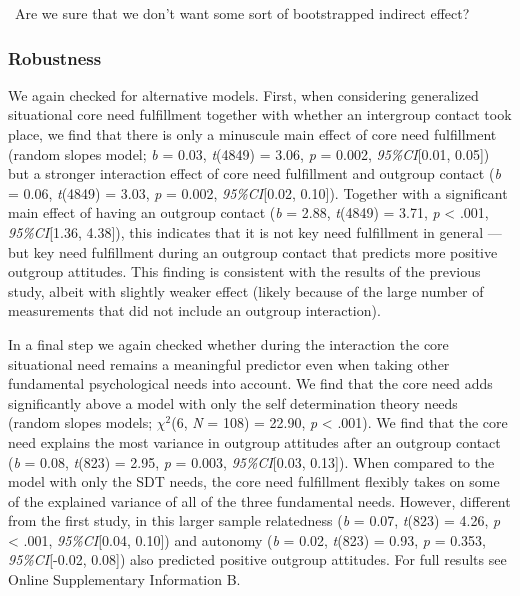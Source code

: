 \faQuestionCircle~Are we sure that we don't want some sort of
bootstrapped indirect effect?

\subsubsection{Robustness}

We again checked for alternative models. First, when considering
generalized situational core need fulfillment together with whether an
intergroup contact took place, we find that there is only a minuscule
main effect of core need fulfillment (random slopes model; \textit{b} =
0.03, \textit{t}(4849) = 3.06, \textit{p} = 0.002,
\textit{95\%CI}{[}0.01, 0.05{]}) but a stronger interaction effect of
core need fulfillment and outgroup contact (\textit{b} = 0.06,
\textit{t}(4849) = 3.03, \textit{p} = 0.002, \textit{95\%CI}{[}0.02,
0.10{]}). Together with a significant main effect of having an outgroup
contact (\textit{b} = 2.88, \textit{t}(4849) = 3.71, \textit{p}
\textless{} .001, \textit{95\%CI}{[}1.36, 4.38{]}), this indicates that
it is not key need fulfillment in general --- but key need fulfillment
during an outgroup contact that predicts more positive outgroup
attitudes. This finding is consistent with the results of the previous
study, albeit with slightly weaker effect (likely because of the large
number of measurements that did not include an outgroup interaction).

In a final step we again checked whether during the interaction the core
situational need remains a meaningful predictor even when taking other
fundamental psychological needs into account. We find that the core need
adds significantly above a model with only the self determination theory
needs (random slopes models; \(\chi^2\)(6, \textit{N} = 108) = 22.90,
\textit{p} \textless{} .001). We find that the core need explains the
most variance in outgroup attitudes after an outgroup contact
(\textit{b} = 0.08, \textit{t}(823) = 2.95, \textit{p} = 0.003,
\textit{95\%CI}{[}0.03, 0.13{]}). When compared to the model with only
the SDT needs, the core need fulfillment flexibly takes on some of the
explained variance of all of the three fundamental needs. However,
different from the first study, in this larger sample relatedness
(\textit{b} = 0.07, \textit{t}(823) = 4.26, \textit{p} \textless{} .001,
\textit{95\%CI}{[}0.04, 0.10{]}) and autonomy (\textit{b} = 0.02,
\textit{t}(823) = 0.93, \textit{p} = 0.353, \textit{95\%CI}{[}-0.02,
0.08{]}) also predicted positive outgroup attitudes. For full results
see Online Supplementary Information B.


